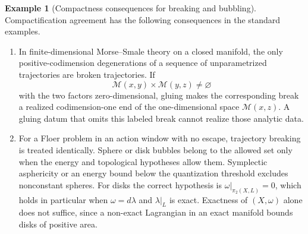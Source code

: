 \documentclass[11pt,letterpaper,twoside]{article}
\theoremstyle{plain}
\theoremstyle{definition}
\newtheorem{example}[theorem]{Example}
\theoremstyle{remark}
\begin{document}
\begin{example}[Compactness consequences for breaking and bubbling]\label{ex:compactness-examples}
Compactification agreement has the following consequences in the standard examples.
\begin{enumerate}
\item In finite-dimensional Morse--Smale theory on a closed manifold, the only positive-codimension degenerations of a sequence of unparametrized trajectories are broken trajectories.  If
\[
 \mathcal M(x,y)\times\mathcal M(y,z)\neq\varnothing
\]
with the two factors zero-dimensional, gluing makes the corresponding break a realized codimension-one end of the one-dimensional space $\mathcal M(x,z)$.  A gluing datum that omits this labeled break cannot realize those analytic data.
\item For a Floer problem in an action window with no escape, trajectory breaking is treated identically.  Sphere or disk bubbles belong to the allowed set only when the energy and topological hypotheses allow them.  Symplectic asphericity or an energy bound below the quantization threshold excludes nonconstant spheres.  For disks the correct hypothesis is $\omega|_{\pi_2(X,L)}=0$, which holds in particular when $\omega=d\lambda$ and $\lambda|_L$ is exact.  Exactness of $(X,\omega)$ alone does not suffice, since a non-exact Lagrangian in an exact manifold bounds disks of positive area.


\end{enumerate}
\end{example}
\end{document}
